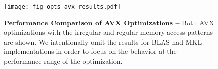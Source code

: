 
\begin{figure}

  \centering
  \texttt{[image: fig-opts-avx-results.pdf]}

  \caption{\textbf{Performance Comparison of AVX Optimizations --}
    Both AVX optimizations with the irregular and regular memory access
    patterns are shown. We intentionally omit the results for BLAS nad
    MKL implementations in order to focus on the behavior at the
    performance range of the optimization.}

  \label{fig-opts-avx-results}

\end{figure}
